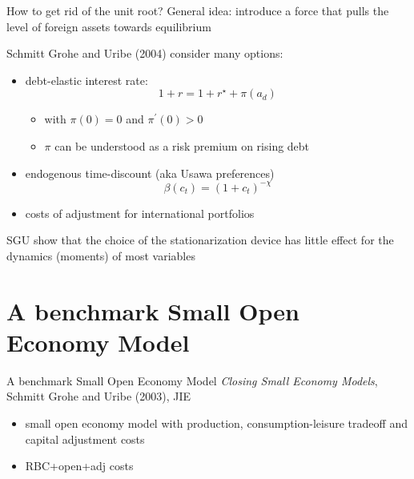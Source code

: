 \documentclass[
  ignorenonframetext,
]{beamer}
\providecommand{\tightlist}{%
  \setlength{\itemsep}{0pt}\setlength{\parskip}{0pt}}\usepackage{longtable,booktabs,array}
\begin{document}
\begin{frame}{How to get rid of the unit root?}
\label{how-to-get-rid-of-the-unit-root}
General idea: introduce a force that pulls the level of foreign assets
towards equilibrium

Schmitt Grohe and Uribe (2004) consider many options:

\begin{itemize}
\tightlist
\item
  debt-elastic interest rate: \[1+r = 1+r^{\star} + \pi(a_d)\]

  \begin{itemize}
  \tightlist
  \item
    with \(\pi(0)=0\) and \(\pi^{\prime}(0)>0\)
  \item
    \(\pi\) can be understood as a risk premium on rising debt
  \end{itemize}
\end{itemize}

\begin{itemize}
\tightlist
\item
  endogenous time-discount (aka Usawa preferences)
  \[\beta(c_t) = (1+c_t)^{-\chi}\]
\item
  costs of adjustment for international portfolios
\end{itemize}

\pause

SGU show that the choice of the stationarization device has little
effect for the dynamics (moments) of most variables
\end{frame}

\section{A benchmark Small Open Economy
Model}\label{a-benchmark-small-open-economy-model}

\begin{frame}{A benchmark Small Open Economy Model}
\label{a-benchmark-small-open-economy-model-1}
\emph{Closing Small Economy Models}, Schmitt Grohe and Uribe (2003), JIE

\begin{itemize}
\tightlist
\item
  small open economy model with production, consumption-leisure tradeoff
  and capital adjustment costs
\item
  RBC+open+adj costs
\end{itemize}
\end{frame}
\end{document}
